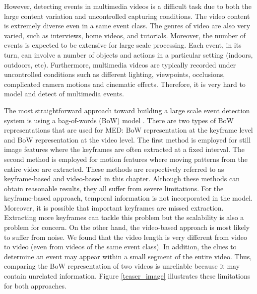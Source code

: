 However, detecting events in multimedia videos is a difficult task due to both the large content variation and uncontrolled capturing conditions. The video content is extremely diverse even in a same event class. The genres of video are also very varied, such as interviews, home videos, and tutorials. Moreover, the number of events is expected to be extensive for large scale processing. Each event, in its turn, can involve a number of objects and actions in a particular setting (indoors, outdoors, etc). Furthermore, multimedia videos are typically recorded under uncontrolled conditions such as different lighting, viewpoints, occlusions, complicated camera motions and cinematic effects. Therefore, it is very hard to model and detect of multimedia events.

The most straightforward approach toward building a large scale event detection system is using a bag-of-words (BoW) model \cite{csurka2004visual}. There are two types of BoW representations that are used for MED: BoW representation at the keyframe level and BoW representation at the video level. The first method is employed for still image features where the keyframes are often extracted at a fixed interval. The second method is employed for motion features where moving patterns from the entire video are extracted. These methods are respectively referred to as keyframe-based \cite{trecvid10:IBM,trecvid10:cuucf,DBLP:conf/trecvid/MatsuoN10} and video-based \cite{trecvid10:IBM,trecvid10:cuucf} in this chapter. Although these methods can obtain reasonable results, they all suffer from severe limitations. For the keyframe-based approach, temporal information is not incorporated in the model. Moreover, it is possible that important keyframes are missed extraction. Extracting more keyframes can tackle this problem but the scalability is also a problem for concern. On the other hand, the video-based approach is most likely to suffer from noise. We found that the video length is very different from video to video (even from videos of the same event class). In addition, the clues to determine an event may appear within a small segment of the entire video. Thus, comparing the BoW representation of two videos is unreliable because it may contain unrelated information. Figure \ref{teaser_image} illustrates these limitations for both approaches. 

